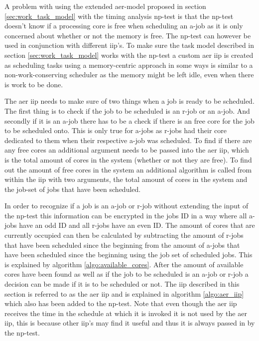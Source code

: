 \documentclass{kththesis}
\begin{document}
A problem with using the extended \acrshort{aer}-model proposed in section
\ref{sec:work_task_model} with the timing analysis \acrshort{np}-test is that the \acrshort{np}-test doesn't
know if a processing core is free when scheduling an \acrshort{a}-job as it is only concerned about
whether or not the memory is free. The \acrshort{np}-test can however be used in conjunction with
different \acrshort{iip}'s. To make sure the task model described in section
\ref{sec:work_task_model} works with the \acrshort{np}-test a custom \acrshort{aer} \acrshort{iip}
is created as scheduling tasks using a memory-centric approach in some ways is similar to a
non-work-conserving scheduler as the memory might be left idle, even when there is work to be done.

The \acrshort{aer} \acrshort{iip} needs to make sure of two things when a job is ready to be
scheduled. The first thing is to check if the job to be scheduled is an \acrshort{r}-job or an
\acrshort{a}-job. And secondly if it is an \acrshort{a}-job there has to be a check if there is an
free core for the job to be scheduled onto. This is only true for \acrshort{a}-jobs as
\acrshort{r}-jobs had their core dedicated to them when their respective \acrshort{a}-job was
scheduled. To find if there are any free cores an additional argument needs to be passed into the
\acrshort{aer} \acrshort{iip}, which is the total amount of cores in the system (whether
or not they are free). To find out the amount of free cores in the system an additional algorithm is
called from within the \acrshort{iip} with two arguments, the total amount of cores in the system
and the job-set of jobs that have been scheduled. 

In order to recognize if a job is an \acrshort{a}-job or \acrshort{r}-job without extending the
input of the \acrshort{np}-test this information can be encrypted in the jobs ID in a way where all
\acrshort{a}-jobs have an odd ID and all \acrshort{r}-jobs have an even ID. The amount of cores that
are currently occupied can then be calculated by subtracting the amount of \acrshort{r}-jobs that
have been scheduled since the beginning from the amount of \acrshort{a}-jobs that have been
scheduled since the beginning using the job set of scheduled jobs. This is explained by algorithm
\ref{algo:available_cores}. After the amount of available cores have been found as well as if the
job to be scheduled is an \acrshort{a}-job or \acrshort{r}-job a decision can be made if it is to be
scheduled or not. The \acrshort{iip} described in this section is referred to as the \acrshort{aer}
\acrshort{iip} and is explained in algorithm \ref{algo:aer_iip} which also has been added to the
\acrshort{np}-test. Note that even though the \acrshort{aer} \acrshort{iip} receives the time in the
schedule at which it is invoked it is not used by the \acrshort{aer} \acrshort{iip}, this is because
other \acrshort{iip}'s may find it useful and thus it is always passed in by the \acrshort{np}-test.
\end{document}
